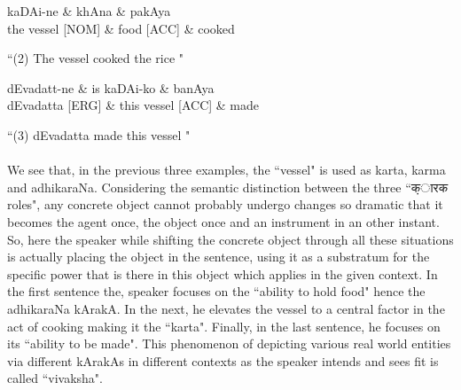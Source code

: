 \documentclass[a4paper,10pt]{article}
\begin{document}
\hypertarget{fig2}{}

\begin{center}
\begin{dependency}[arc edge, arc angle=80, text only label, label style={above}]
   \begin{deptext}[column sep=1em]
      kaDAi-ne \& khAna \& pakAya \\
      the vessel [NOM] \& food [ACC]  \& cooked \\
   \end{deptext}
\end{dependency} 

 ``(2) The vessel cooked the rice " 
 

\end{center}

\hypertarget{fig1}{}

\begin{center}
\begin{dependency}[arc edge, arc angle=80, text only label, label style={above}]
   \begin{deptext}[column sep=1em]
      dEvadatt-ne \& is kaDAi-ko \& banAya \\
      dEvadatta [ERG] \& this vessel [ACC]  \& made \\
   \end{deptext}
\end{dependency} 

 ``(3) dEvadatta made this vessel " 
 

\end{center}

\paragraph{} We see that, in the previous three examples, the ``vessel" is used as karta, karma and adhikaraNa. 
Considering the semantic distinction between the three ``{\d कारक } roles", any concrete object cannot probably undergo changes so dramatic that 
it becomes the agent once, the object once and an instrument in an other instant. So, here the speaker while shifting the concrete object 
through all these situations is actually placing the object in the sentence, using it as a substratum for the specific power 
that is there in this object which applies in the given context. 
In the first sentence the, speaker focuses on the ``ability to hold food" hence the adhikaraNa kArakA. 
In the next, he elevates the vessel to a central factor in the act of cooking making it the ``karta".
Finally, in the last sentence, he focuses on its ``ability to be made". 
This phenomenon of depicting various real world entities via different kArakAs in different contexts as the speaker intends and sees fit is called ``vivaksha".
\end{document}
